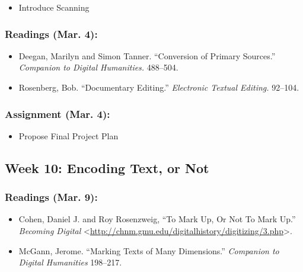 \documentclass[]{article}
\begin{document}
\begin{itemize}
\itemsep1pt\parskip0pt
\item
  Introduce Scanning
\end{itemize}

\subsubsection{Readings (Mar. 4):}\label{readings-mar.-4}

\begin{itemize}
\itemsep1pt\parskip0pt
\item
  Deegan, Marilyn and Simon Tanner. ``Conversion of Primary Sources.''
  \emph{Companion to Digital Humanities.} 488--504.
\item
  Rosenberg, Bob. ``Documentary Editing.'' \emph{Electronic Textual
  Editing.} 92--104.
\end{itemize}

\subsubsection{Assignment (Mar. 4):}\label{assignment-mar.-4}

\begin{itemize}
\itemsep1pt\parskip0pt
\item
  Propose Final Project Plan
\end{itemize}

\subsection{Week 10: Encoding Text, or
Not}\label{week-10-encoding-text-or-not}

\subsubsection{Readings (Mar. 9):}\label{readings-mar.-9}

\begin{itemize}
\itemsep1pt\parskip0pt
\item
  Cohen, Daniel J. and Roy Rosenzweig, ``To Mark Up, Or Not To Mark
  Up.'' \emph{Becoming Digital}
  \textless{}\url{http://chnm.gmu.edu/digitalhistory/digitizing/3.php}\textgreater{}.
\item
  McGann, Jerome. ``Marking Texts of Many Dimensions.'' \emph{Companion
  to Digital Humanities} 198--217.
\end{itemize}
\end{document}
